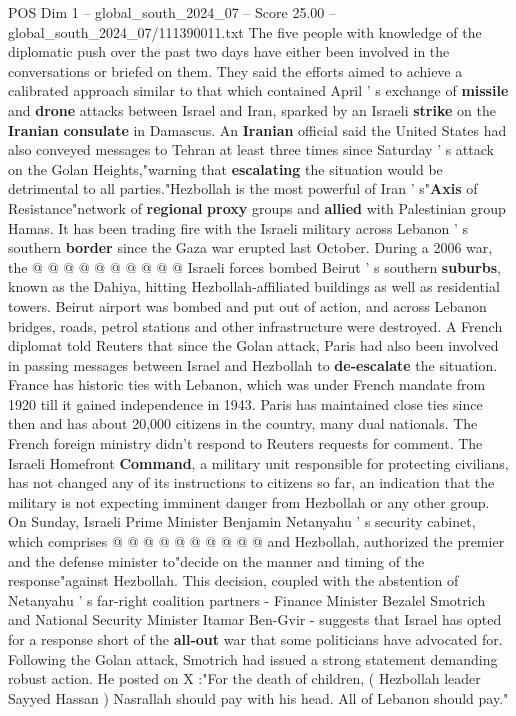 \begin{textsample}{POS Dim 1 – global\_south\_2024\_07 – Score 25.00 – global\_south\_2024\_07/111390011.txt}
The five people with knowledge of the diplomatic push over the past two days have either been involved in the conversations or briefed on them.
They said the efforts aimed to achieve a calibrated approach similar to that which contained April ' s exchange of \textbf{missile} and \textbf{drone} attacks between Israel and Iran, sparked by an Israeli \textbf{strike} on the \textbf{Iranian} \textbf{consulate} in Damascus.
An \textbf{Iranian} official said the United States had also conveyed messages to Tehran at least three times since Saturday ' s attack on the Golan Heights,"warning that \textbf{escalating} the situation would be detrimental to all parties."Hezbollah is the most powerful of Iran ' s"\textbf{Axis} of Resistance"network of \textbf{regional} \textbf{proxy} groups and \textbf{allied} with Palestinian group Hamas.
It has been trading fire with the Israeli military across Lebanon ' s southern \textbf{border} since the Gaza war erupted last October.
During a 2006 war, the @ @ @ @ @ @ @ @ @ @ Israeli forces bombed Beirut ' s southern \textbf{suburbs}, known as the Dahiya, hitting Hezbollah-affiliated buildings as well as residential towers.
Beirut airport was bombed and put out of action, and across Lebanon bridges, roads, petrol stations and other infrastructure were destroyed.
A French diplomat told Reuters that since the Golan attack, Paris had also been involved in passing messages between Israel and Hezbollah to \textbf{de-escalate} the situation.
France has historic ties with Lebanon, which was under French mandate from 1920 till it gained independence in 1943.
Paris has maintained close ties since then and has about 20,000 citizens in the country, many dual nationals.
The French foreign ministry didn't respond to Reuters requests for comment.
The Israeli Homefront \textbf{Command}, a military unit responsible for protecting civilians, has not changed any of its instructions to citizens so far, an indication that the military is not expecting imminent danger from Hezbollah or any other group.
On Sunday, Israeli Prime Minister Benjamin Netanyahu ' s security cabinet, which comprises @ @ @ @ @ @ @ @ @ @ and Hezbollah, authorized the premier and the defense minister to"decide on the manner and timing of the response"against Hezbollah.
This decision, coupled with the abstention of Netanyahu ' s far-right coalition partners - Finance Minister Bezalel Smotrich and National Security Minister Itamar Ben-Gvir - suggests that Israel has opted for a response short of the \textbf{all-out} war that some politicians have advocated for.
Following the Golan attack, Smotrich had issued a strong statement demanding robust action.
He posted on X :"For the death of children, ( Hezbollah leader Sayyed Hassan ) Nasrallah should pay with his head.
All of Lebanon should pay."

\end{textsample}
